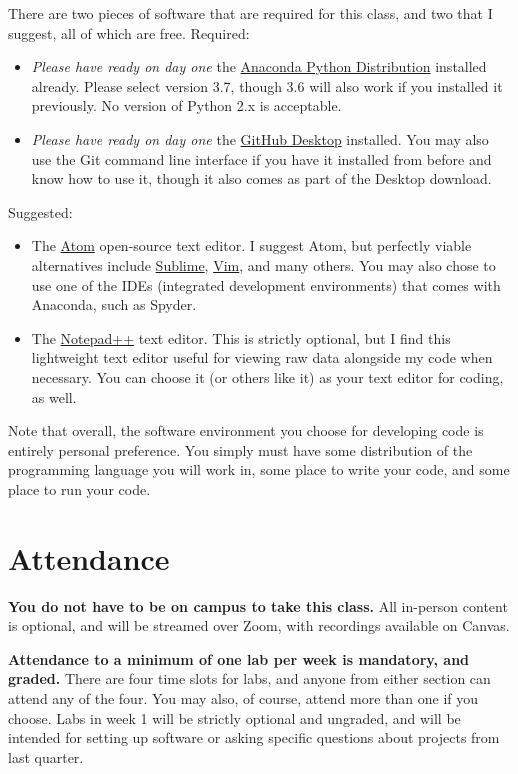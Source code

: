 \documentclass{article}
\begin{document}
There are two pieces of software that are required for this class, and two that I suggest, all of which are free.  Required:
\begin{itemize}
	\item \emph{Please have ready on day one} the \href{https://www.anaconda.com/distribution/}{Anaconda Python Distribution} installed already.  Please select version 3.7, though 3.6 will also work  if you installed it previously.  No version of Python 2.x is acceptable.
	\item \emph{Please have ready on day one} the \href{https://desktop.github.com/}{GitHub Desktop} installed.  You may also use the Git command line interface if you have it installed from before and know how to use it, though it also comes as part of the Desktop download.
\end{itemize}

Suggested:
\begin{itemize}
	\item The \href{https://atom.io/}{Atom} open-source text editor. I suggest Atom, but perfectly viable alternatives include \href{https://www.sublimetext.com/}{Sublime}, \href{https://www.vim.org/}{Vim}, and many others.  You may also chose to use one of the IDEs (integrated development environments) that comes with Anaconda, such as Spyder.
	\item The \href{https://notepad-plus-plus.org/}{Notepad++} text editor.  This is strictly optional, but I find this lightweight text editor useful for viewing raw data alongside my code when necessary.  You can choose it (or others like it) as your text editor for coding, as well.
\end{itemize}

Note that overall, the software environment you choose for developing code is entirely personal preference.  You simply must have some distribution of the programming language you will work in, some place to write your code, and some place to run your code.
	
\section*{Attendance}
\textbf{You do not have to be on campus to take this class.}  All in-person content is optional, and will be streamed over Zoom, with recordings available on Canvas.

\textbf{Attendance to a minimum of one lab per week is mandatory, and graded.}  There are four time slots for labs, and anyone from either section can attend any of the four.  You may also, of course, attend more than one if you choose.  Labs in week 1 will be strictly optional and ungraded, and will be intended for setting up software or asking specific questions about projects from last quarter.
\end{document}
